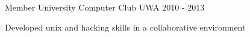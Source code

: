 \begin{cventries}
  \cventry
    {Member} %
    {University Computer Club} %
    {UWA} %
    {2010 - 2013} %
    {
      \begin{cvitems} %
        \item {Developed unix and hacking skills in a collaborative environment}
      \end{cvitems}
    }

\end{cventries}
